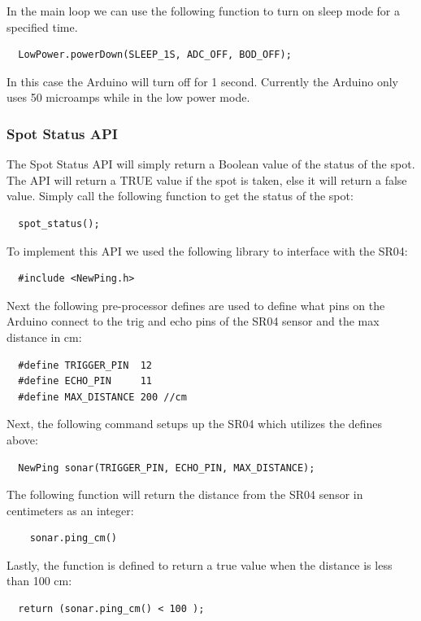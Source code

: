 \documentclass[paper=a4, fontsize=12pt]{scrartcl}
\numberwithin{equation}{section}		%
\numberwithin{figure}{section}			%
\numberwithin{table}{section}				%
\begin{document}
In the main loop we can use the following function to turn on sleep mode for a specified time. 

\begin{verbatim}
  LowPower.powerDown(SLEEP_1S, ADC_OFF, BOD_OFF); 
\end{verbatim}

In this case the Arduino will turn off for 1 second. Currently the Arduino only uses 50 microamps while in the low power mode. 

\subsubsection{Spot Status API}

The Spot Status API will simply return a Boolean value of the status of the spot. The API will return a TRUE value if the spot is taken, else it will return a false value. Simply call the following function to get the status of the spot:
\begin{verbatim}
  spot_status();
\end{verbatim}

To implement this API we used the following library to interface with the SR04:
\begin{verbatim}
  #include <NewPing.h>
\end{verbatim}
Next the following pre-processor defines are used to define what pins on the Arduino connect to the trig and echo pins of the SR04 sensor and the max distance in cm:

\begin{verbatim}
  #define TRIGGER_PIN  12
  #define ECHO_PIN     11
  #define MAX_DISTANCE 200 //cm
\end{verbatim}

Next, the following command setups up the SR04 which utilizes the defines above: 

\begin{verbatim}
  NewPing sonar(TRIGGER_PIN, ECHO_PIN, MAX_DISTANCE);
\end{verbatim}

The following function will return the distance from the SR04 sensor in centimeters as an integer:
\begin{verbatim}
    sonar.ping_cm()
\end{verbatim}
Lastly, the function is defined to return a true value when the distance is less than 100 cm:
\begin{verbatim}
  return (sonar.ping_cm() < 100 );
\end{verbatim}
\end{document}
